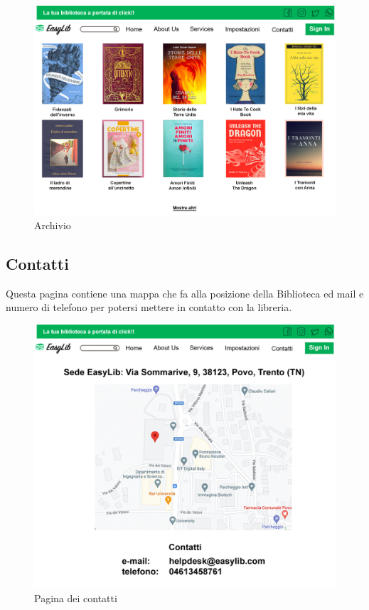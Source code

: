 \documentclass{article}
\begin{document}
\begin{figure}[H]
    \centering
    \includegraphics[width=130mm]{D1/Images/Archivio.png}
    \caption{Archivio}
\end{figure}

\subsection{Contatti}
Questa pagina contiene una mappa che fa alla posizione della Biblioteca ed mail e numero di telefono per potersi mettere in contatto con la libreria.

\begin{figure}[H]
    \centering
    \includegraphics[width=130mm]{D1/Images/Contatti.png}
    \caption{Pagina dei contatti}
\end{figure}
\end{document}
